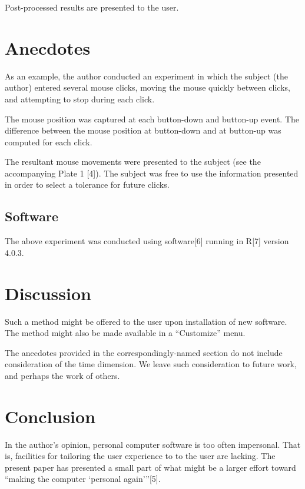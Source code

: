 \documentclass{article}
\begin{document}
Post-processed results are presented to the user.

\section*{Anecdotes}

As an example, the author conducted an experiment in which
the subject (the author) entered several mouse clicks, moving the
mouse quickly between clicks, and attempting to stop during each
click.

The mouse position was captured at each button-down and
button-up event.
The difference between the mouse position at button-down
and at button-up was computed for each click.

The resultant mouse movements were presented to the subject
(see the accompanying Plate 1 [4]).
The subject was free to use the information presented in order
to select a tolerance for future clicks.

\subsection*{Software}

The above experiment was conducted using software[6] running in
R[7] version 4.0.3.

\section*{Discussion}

Such a method might be offered to the user upon installation of
new software.
The method might also be made available in a ``Customize'' menu.

The anecdotes provided in the correspondingly-named section do
not include consideration of the time dimension.
We leave such consideration to future work, and perhaps the work
of others.

\section*{Conclusion}

In the author's opinion, personal computer software is too
often impersonal.
That is, facilities for tailoring the user experience to to the
user are lacking.
The present paper has presented a small part of what might be
a larger effort toward ``making the computer `personal again{'}{''}[5].
\end{document}
